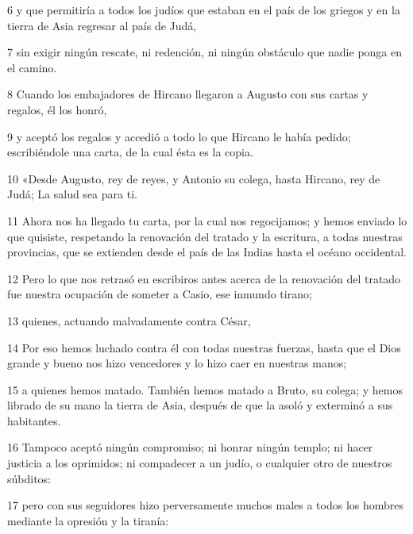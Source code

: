 \par 6 y que permitiría a todos los judíos que estaban en el país de los griegos y en la tierra de Asia regresar al país de Judá,

\par 7 sin exigir ningún rescate, ni redención, ni ningún obstáculo que nadie ponga en el camino.

\par 8 Cuando los embajadores de Hircano llegaron a Augusto con sus cartas y regalos, él los honró,

\par 9 y aceptó los regalos y accedió a todo lo que Hircano le había pedido; escribiéndole una carta, de la cual ésta es la copia.

\par 10 «Desde Augusto, rey de reyes, y Antonio su colega, hasta Hircano, rey de Judá; La salud sea para ti.

\par 11 Ahora nos ha llegado tu carta, por la cual nos regocijamos; y hemos enviado lo que quisiste, respetando la renovación del tratado y la escritura, a todas nuestras provincias, que se extienden desde el país de las Indias hasta el océano occidental.

\par 12 Pero lo que nos retrasó en escribiros antes acerca de la renovación del tratado fue nuestra ocupación de someter a Casio, ese inmundo tirano;

\par 13 quienes, actuando malvadamente contra César,

\par 14 Por eso hemos luchado contra él con todas nuestras fuerzas, hasta que el Dios grande y bueno nos hizo vencedores y lo hizo caer en nuestras manos;

\par 15 a quienes hemos matado. También hemos matado a Bruto, su colega; y hemos librado de su mano la tierra de Asia, después de que la asoló y exterminó a sus habitantes.

\par 16 Tampoco aceptó ningún compromiso; ni honrar ningún templo; ni hacer justicia a los oprimidos; ni compadecer a un judío, o cualquier otro de nuestros súbditos:

\par 17 pero con sus seguidores hizo perversamente muchos males a todos los hombres mediante la opresión y la tiranía:

